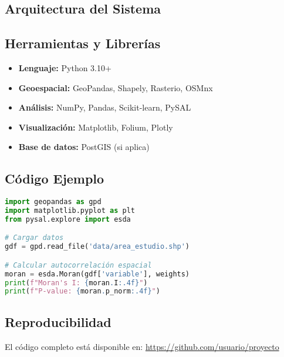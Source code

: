 \documentclass[11pt,letterpaper]{article}
\begin{document}
\subsection{Arquitectura del Sistema}


\subsection{Herramientas y Librerías}

\begin{itemize}
    \item \textbf{Lenguaje:} Python 3.10+
    \item \textbf{Geoespacial:} GeoPandas, Shapely, Rasterio, OSMnx
    \item \textbf{Análisis:} NumPy, Pandas, Scikit-learn, PySAL
    \item \textbf{Visualización:} Matplotlib, Folium, Plotly
    \item \textbf{Base de datos:} PostGIS (si aplica)
\end{itemize}

\subsection{Código Ejemplo}

\begin{lstlisting}[language=Python, caption=Ejemplo de código para análisis espacial]
import geopandas as gpd
import matplotlib.pyplot as plt
from pysal.explore import esda

# Cargar datos
gdf = gpd.read_file('data/area_estudio.shp')

# Calcular autocorrelación espacial
moran = esda.Moran(gdf['variable'], weights)
print(f"Moran's I: {moran.I:.4f}")
print(f"P-value: {moran.p_norm:.4f}")
\end{lstlisting}

\subsection{Reproducibilidad}

El código completo está disponible en: \url{https://github.com/usuario/proyecto}

\end{document}
